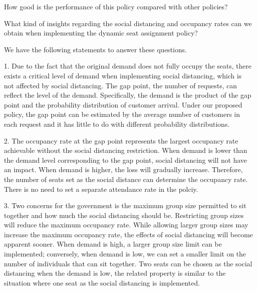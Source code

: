 How good is the performance of this policy compared with other policies? 

What kind of insights regarding the social distancing and occupancy rates can we obtain when implementing the dynamic seat assignment policy?

We have the following statements to answer these questions.



1. Due to the fact that the original demand does not fully occupy the seats, there exists a critical level of demand when implementing social distancing, which is not affected by social distancing. The gap point, the number of requests, can reflect the level of the demand. Specifically, the demand is the product of the gap point and the probability distribution of customer arrival. Under our proposed policy, the gap point can be estimated by the average number of customers in each request and it has little to do with different probability distributions.


2. The occupancy rate at the gap point represents the largest occupancy rate achievable without the social distancing restriction. When demand is lower than the demand level corresponding to the gap point, social distancing will not have an impact. When demand is higher, the loss will gradually increase. Therefore, the number of seats set as the social distance can determine the occupancy rate. There is no need to set a separate attendance rate in the polciy.


3. Two concerns for the government is the maximum group size permitted to sit together and how much the social distancing should be. Restricting group sizes will reduce the maximum occupancy rate. While allowing larger group sizes may increase the maximum occupancy rate, the effects of social distancing will become apparent sooner. When demand is high, a larger group size limit can be implemented; conversely, when demand is low, we can set a smaller limit on the number of individuals that can sit together. Two seats can be chosen as the social distancing when the demand is low, the related property is similar to the situation where one seat as the social distancing is implemented.


